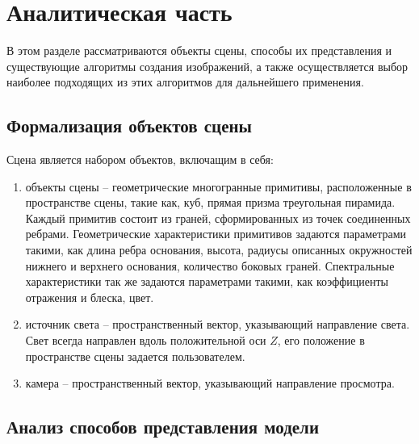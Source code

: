 \chapter{Аналитическая часть}

В этом разделе рассматриваются объекты сцены, способы их представления и существующие алгоритмы создания изображений, а также осуществляется выбор наиболее подходящих из этих алгоритмов для дальнейшего применения.

\section{Формализация объектов сцены}

Сцена является набором объектов, включащим в себя:

\begin{enumerate}
	\item объекты сцены -- геометрические многогранные примитивы, расположенные в пространстве сцены, такие как, куб, прямая призма треугольная пирамида. Каждый примитив состоит из граней, сформированных из точек соединенных ребрами. Геометрические характеристики примитивов задаются параметрами такими, как длина ребра основания, высота, радиусы описанных окружностей нижнего и верхнего основания, количество боковых граней. Спектральные характеристики так же задаются параметрами такими, как коэффициенты отражения и блеска, цвет.
	\item источник света -- пространственный вектор, указывающий направление света. Свет всегда направлен вдоль положительной оси $Z$, его положение в пространстве сцены задается пользователем.
	\item камера -- пространственный вектор, указывающий направление просмотра.
\end{enumerate}

\section{Анализ способов представления модели}

